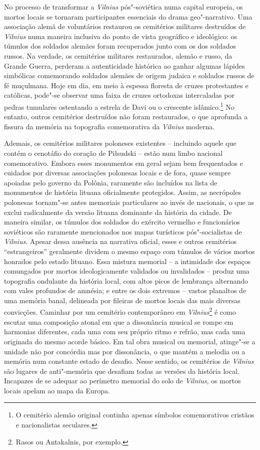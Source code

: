 No processo de transformar a \textit{Vilnius} pós"-soviética numa capital
europeia, os mortos locais se tornaram participantes essenciais do drama
geo"-narrativo. Uma associação alemã de voluntários restaurou os
cemitérios militares destruídos de \textit{Vilnius} numa maneira inclusiva do
ponto de vista geográfico e ideológico: os túmulos dos soldados alemães
foram recuperados junto com os dos soldados russos. Na verdade, os
cemitérios militares restaurados, alemão e russo, da Grande Guerra,
perderam a autenticidade histórica ao ganhar algumas lápides simbólicas
comemorando soldados alemães de origem judaica e soldados russos de fé
muçulmana. Hoje em dia, em meio à espessa floresta de cruzes
protestantes e católicas, pode"-se observar uma faixa de cruzes ortodoxas
intercaladas por pedras tumulares ostentando a estrela de Davi ou o
crescente islâmico.\footnote{O cemitério alemão original continha apenas
símbolos comemorativos cristãos e nacionalistas seculares.} No entanto,
outros cemitérios destruídos não foram restaurados, o que aprofunda a
fissura da memória na topografia comemorativa da \textit{Vilnius} moderna.

Ademais, os cemitérios militares poloneses existentes -- incluindo aquele
que contém o cenotáfio do coração de Piłsudski -- estão num limbo
nacional comemorativo. Embora esses monumentos em geral sejam bem
frequentados e cuidados por diversas associações polonesas locais e de
fora, quase sempre apoiadas pelo governo da Polônia, raramente são
incluídos na lista de monumentos de história lituana oficialmente
protegidos. Assim, as necrópoles polonesas tornam"-se antes memoriais
particulares ao invés de nacionais, o que as exclui radicalmente da
versão lituana dominante da história da cidade. De maneira similar, os
túmulos dos soldados do exército vermelho e funcionários soviéticos são
raramente mencionados nos mapas turísticos pós"-socialistas de \textit{Vilnius}.
Apesar dessa ausência na narrativa oficial, esses e outros cemitérios
``estrangeiros'' geralmente dividem o mesmo espaço com túmulos de vários
mortos honrados pelo estado lituano. Essa mistura memorial -- a
intimidade dos espaços comungados por mortos ideologicamente validados
ou invalidados -- produz uma topografia ondulante da história local, com
altos picos de lembrança alternando com vales profundos de amnésia; e
entre os dois extremos -- vastos planaltos de uma memória banal,
delineada por fileiras de mortos locais das mais diversas convicções.
Caminhar por um cemitério contemporâneo em \textit{Vilnius}\footnote{Rasos ou Antakalnis,
por exemplo.} é como escutar uma composição atonal em que a dissonância
musical se rompe em harmonias diferentes, cada uma com seu próprio ritmo
e refrão, mas cada uma originada do mesmo acorde básico. Em tal obra
musical ou memorial, atinge"-se a unidade não por concórdia mas por
dissonância, o que mantém a melodia ou a memória num constante estado de
desafio. Nesse sentido, os cemitérios de \textit{Vilnius} são lugares de
anti"-memória que desafiam todas as versões da história local. Incapazes
de se adequar ao perímetro memorial do solo de \textit{Vilnius}, os mortos locais
apelam ao mapa da Europa.

